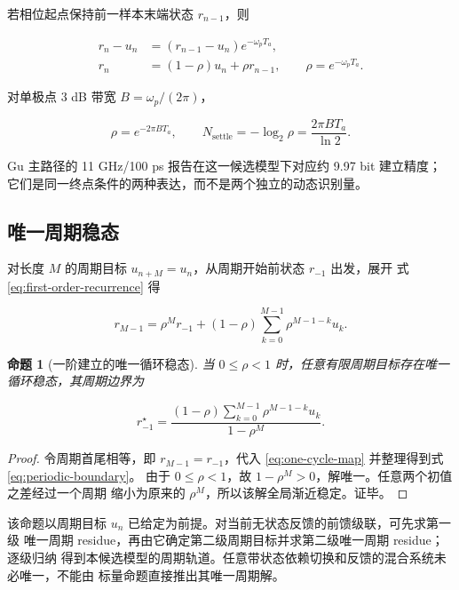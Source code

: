 \documentclass[11pt,a4paper]{ctexart}
\theoremstyle{adcplain}
\newtheorem{proposition}{命题}[section]
\theoremstyle{definition}
\begin{document}
若相位起点保持前一样本末端状态 $r_{n-1}$，则

\begin{align}
  r_n-u_n
  &=(r_{n-1}-u_n)e^{-\omega_pT_a},\\
  r_n
  &=(1-\rho)u_n+\rho r_{n-1},
  \qquad
  \rho=e^{-\omega_pT_a}.
  \label{eq:first-order-recurrence}
\end{align}

对单极点 $3$ dB 带宽 $B=\omega_p/(2\pi)$，

\begin{equation}
  \rho=e^{-2\pi BT_a},
  \qquad
  N_{\mathrm{settle}}=-\log_2\rho
  =\frac{2\pi BT_a}{\ln2}.
  \label{eq:settling-bits}
\end{equation}

Gu 主路径的 11 GHz/100 ps 报告在这一候选模型下对应约 9.97 bit 建立精度；
它们是同一终点条件的两种表达，而不是两个独立的动态识别量。

\subsection{唯一周期稳态}

对长度 $M$ 的周期目标 $u_{n+M}=u_n$，从周期开始前状态 $r_{-1}$ 出发，展开
式 \eqref{eq:first-order-recurrence} 得

\begin{equation}
  r_{M-1}
  =
  \rho^M r_{-1}
  +(1-\rho)
  \sum_{k=0}^{M-1}\rho^{M-1-k}u_k.
  \label{eq:one-cycle-map}
\end{equation}

\begin{proposition}[一阶建立的唯一循环稳态]
当 $0\le\rho<1$ 时，任意有限周期目标存在唯一循环稳态，其周期边界为

\begin{equation}
  r_{-1}^{\star}
  =
  \frac{(1-\rho)
  \sum_{k=0}^{M-1}\rho^{M-1-k}u_k}
  {1-\rho^M}.
  \label{eq:periodic-boundary}
\end{equation}
\end{proposition}

\begin{proof}
令周期首尾相等，即 $r_{M-1}=r_{-1}$，代入
\eqref{eq:one-cycle-map} 并整理得到式 \eqref{eq:periodic-boundary}。
由于 $0\le\rho<1$，故 $1-\rho^M>0$，解唯一。任意两个初值之差经过一个周期
缩小为原来的 $\rho^M$，所以该解全局渐近稳定。证毕。
\end{proof}

该命题以周期目标 $u_n$ 已给定为前提。对当前无状态反馈的前馈级联，可先求第一级
唯一周期 residue，再由它确定第二级周期目标并求第二级唯一周期 residue；逐级归纳
得到本候选模型的周期轨道。任意带状态依赖切换和反馈的混合系统未必唯一，不能由
标量命题直接推出其唯一周期解。
\end{document}
